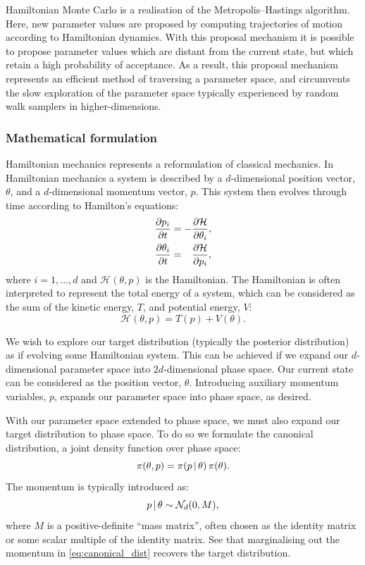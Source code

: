 Hamiltonian Monte Carlo is a realisation of the Metropolis--Hastings algorithm.
Here, new parameter values are proposed by computing trajectories of motion
according to Hamiltonian dynamics. With this proposal mechanism it is possible
to propose parameter values which are distant from the current state, but which
retain a high probability of acceptance. As a result, this proposal mechanism
represents an efficient method of traversing a parameter space, and circumvents
the slow exploration of the parameter space typically experienced by random
walk samplers in higher-dimensions.

\subsubsection{Mathematical formulation}

Hamiltonian mechanics represents a reformulation of classical mechanics. In
Hamiltonian mechanics a  system is described by a $d$-dimensional position
vector, $\theta$, and a $d$-dimensional momentum vector, $p$. This system then
evolves through time according to Hamilton's equations:
\begin{align}
  \begin{split}
    \pdv{p_i}{t}      &= - \pdv{\mathcal{H}}{\theta_i},      \\
    \pdv{\theta_i}{t} &= \hphantom{-} \pdv{\mathcal{H}}{p_i},
  \end{split}
\end{align}
where $i=1,\ldots,d$ and $\mathcal{H}(\theta,  p)$ is the Hamiltonian. The
Hamiltonian is often interpreted to represent the total energy of a system,
which can be considered as the sum of the kinetic energy, $T$, and potential
energy, $V$:
\begin{equation}
  \label{eq:hamiltonian_decomp}
  \mathcal{H}(\theta, p) = T(p) + V(\theta).
\end{equation}

We wish to explore our target distribution (typically the posterior
distribution) as if evolving some Hamiltonian system. This can be achieved if
we expand our $d$-dimensional parameter space into $2d$-dimensional phase
space. Our current state can be considered as the position vector, $\theta$.
Introducing auxiliary momentum variables, $p$, expands our parameter space into
phase space, as desired.

With our parameter space extended to phase space, we must also expand our
target distribution to phase space. To do so we formulate the canonical
distribution, a joint density function over phase space:
\begin{equation}
  \label{eq:canonical_dist}
  \pi(\theta, p) = \pi(p \,|\,\theta) \, \pi(\theta).
\end{equation}
The momentum is typically introduced as:
\begin{equation}
  p \,|\, \theta \sim \mathcal{N}_d(0, M),
\end{equation}
where $M$ is a positive-definite ``mass matrix'', often chosen as the identity
matrix or some scalar multiple of the identity matrix. See that marginalising
out the momentum in \cref{eq:canonical_dist} recovers the target distribution.

